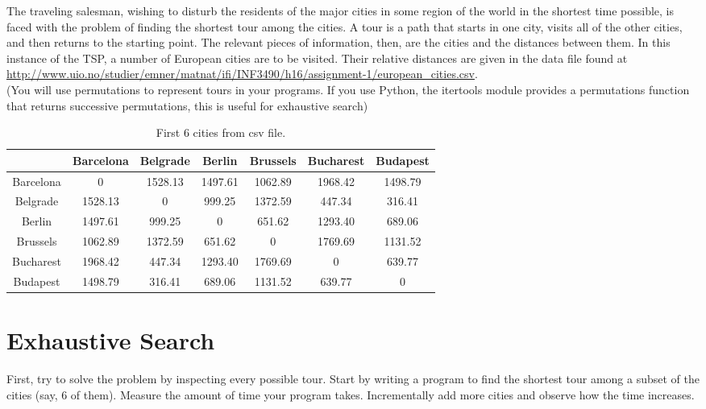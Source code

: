 The traveling salesman, wishing to disturb the residents of the major cities
in some region of the world in the shortest time possible, is faced with the
problem of finding the shortest tour among the cities. A tour is a path that
starts in one city, visits all of the other cities, and then returns to the
starting point. The relevant pieces of information, then, are the cities and
the distances between them. In this instance of the TSP, a number of European
cities are to be visited. Their relative distances are given in the data file
found at
\url{http://www.uio.no/studier/emner/matnat/ifi/INF3490/h16/assignment-1/european_cities.csv}.\\
(You will use permutations to represent tours in your programs. If you use
Python, the itertools module provides a permutations function that returns
successive permutations, this is useful for exhaustive search)

\begin{table}[]
\centering
  \begin{tabular}{|c|c|c|c|c|c|c|}
    \hline
              & Barcelona & Belgrade & Berlin  & Brussels & Bucharest & Budapest \\ \hline
    Barcelona & 0         & 1528.13  & 1497.61 & 1062.89  & 1968.42   & 1498.79  \\ \hline
    Belgrade  & 1528.13   & 0        & 999.25  & 1372.59  & 447.34    & 316.41   \\ \hline
    Berlin    & 1497.61   & 999.25   & 0       & 651.62   & 1293.40   & 689.06   \\ \hline
    Brussels  & 1062.89   & 1372.59  & 651.62  & 0        & 1769.69   & 1131.52  \\ \hline
    Bucharest & 1968.42   & 447.34   & 1293.40 & 1769.69  & 0         & 639.77   \\ \hline
    Budapest  & 1498.79   & 316.41   & 689.06  & 1131.52  & 639.77    & 0        \\ \hline
  \end{tabular}
  \caption{First 6 cities from csv file.}
  \label{tab:cities}
\end{table}

\section*{Exhaustive Search}
First, try to solve the problem by inspecting every possible tour. Start by
writing a program to find the shortest tour among a subset of the cities (say,
6 of them). Measure the amount of time your program takes. Incrementally add
more cities and observe how the time increases.\\

